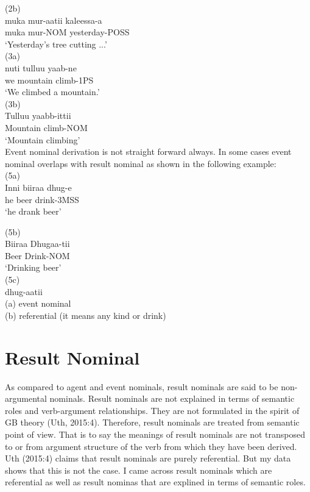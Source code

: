 \documentclass[11pt,a4paper]{article}
\begin{document}
(2b)	\\
\indent muka		mur-aatii	kaleessa-a\\
\indent muka		mur-NOM	yesterday-POSS\\
\indent ‘Yesterday’s tree cutting ...’\\


(3a) 	\\
\indent nuti 		tulluu 		yaab-ne 	\\	
\indent we		mountain	climb-1PS\\
\indent ‘We climbed a mountain.’\\


(3b) \\
\indent Tulluu yaabb-ittii 	\\	
\indent Mountain climb-NOM	\\
\indent ‘Mountain climbing’\\

Event nominal derivation is not straight forward always. In some cases event nominal overlaps with result nominal as shown in the following example:\\

(5a)  \\
\indent Inni 	 biiraa 	dhug-e\\
\indent he 	 beer 	drink-3MSS\\
\indent ‘he drank beer’\indent

(5b) 	\\
\indent Biiraa 	Dhugaa-tii\\
\indent Beer  	Drink-NOM\\
\indent‘Drinking beer’\\

(5c)\\
\indent	dhug-aatii\\
\indent (a) event nominal \\
\indent (b) referential (it means any kind or drink)\\

\section{Result Nominal}
As compared to agent and event nominals, result nominals are said to be non-argumental nominals. Result nominals are not explained in terms of semantic roles and verb-argument relationships. They are not formulated in the spirit of GB theory (Uth, 2015:4). Therefore, result nominals are treated from semantic point of view. That is to say the meanings of result nominals are not transposed to or from argument structure of the verb from which they have been derived. Uth (2015:4) claims that result nominals are purely  referential. But my data shows that this is not the case. I came across result nominals which are referential as well as result nominas that are explined in terms of semantic roles. 
\end{document}
